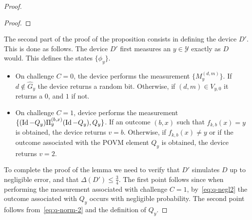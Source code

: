\documentclass[11pt]{article}
\theoremstyle{remark}
\theoremstyle{definition}
\newcommand{\Tr}{\mbox{\rm Tr}}
\newcommand{\Id}{\ensuremath{\mathop{\rm Id}\nolimits}}
\newcommand{\mY}{\ensuremath{\mathcal{Y}}}
\DeclareMathOperator{\negl}{negl}
\newcommand{\dset}{G}
\begin{document}
\begin{proof}
\begin{proof}
%
\end{proof}

The second part of the proof of the proposition consists in defining the device $D'$. This is done as follows. The device $D'$ first measures an $y\in\mY$ exactly as $D$ would. This defines the states $\{\phi_y\}$. %
\begin{itemize}
\item On challenge $C=0$, the device performs the measurement $\{M_y^{(d,m)}\}$. If $d\notin \hat{\dset}_y$ the device returns a random bit. Otherwise, if $(d,m)\in V_{y,0}$ it returns a $0$, and $1$ if not. %
\item On challenge $C=1$, device performs the measurement $\{(\Id-Q_y)\Pi_y^{(b,x)}(\Id-Q_y),Q_y\}$. If an outcome $(b,x)$ such that $f_{k,b}(x)=y$ is obtained, the device returns $v=b$. Otherwise, if $f_{k,b}(x)\neq y$ or if the outcome associated with the POVM element $Q_y$ is obtained, the device returns $v=2$. 
\end{itemize}
To complete the proof of the lemma we need to verify that $D'$ simulates $D$ up to negligible error, and that $\Delta(D') \leq \frac{3}{4}$. The first point follows since when performing the measurement associated with challenge $C=1$, by~\eqref{eq:q-negl2} the outcome associated with $Q_y$ occurs with negligible probability. 
The second point follows from~\eqref{eq:q-norm-2} and the definition of $Q_y$.
\end{proof}
\end{document}
